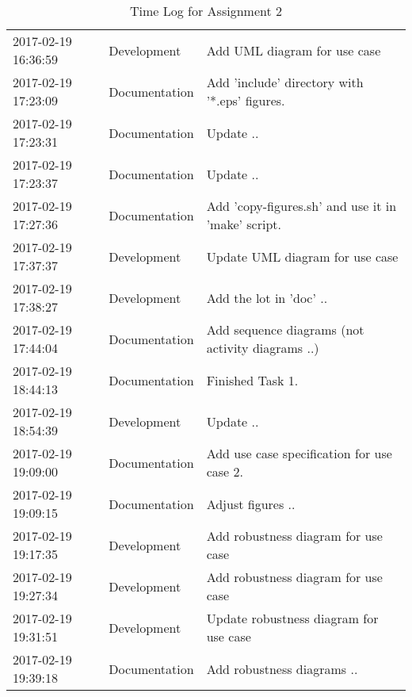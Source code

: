 \begin{table}[]
\begin{tabular}{@{}l|l|l}
    2017-02-19 16:36:59 & Development   & Add UML diagram for use case #2 ..                 \\
    2017-02-19 17:23:09 & Documentation & Add 'include' directory with '*.eps' figures.      \\
    2017-02-19 17:23:31 & Documentation & Update ..                                          \\
    2017-02-19 17:23:37 & Documentation & Update ..                                          \\
    2017-02-19 17:27:36 & Documentation & Add 'copy-figures.sh' and use it in 'make' script. \\
    2017-02-19 17:37:37 & Development   & Update UML diagram for use case #2.                \\
    2017-02-19 17:38:27 & Development   & Add the lot in 'doc' ..                            \\
    2017-02-19 17:44:04 & Documentation & Add sequence diagrams (not activity diagrams ..)   \\
    2017-02-19 18:44:13 & Documentation & Finished Task 1.                                   \\
    2017-02-19 18:54:39 & Development   & Update ..                                          \\
    2017-02-19 19:09:00 & Documentation & Add use case specification for use case 2.         \\
    2017-02-19 19:09:15 & Documentation & Adjust figures ..                                  \\
    2017-02-19 19:17:35 & Development   & Add robustness diagram for use case #1.            \\
    2017-02-19 19:27:34 & Development   & Add robustness diagram for use case #2.            \\
    2017-02-19 19:31:51 & Development   & Update robustness diagram for use case #1.         \\
    2017-02-19 19:39:18 & Documentation & Add robustness diagrams ..                         \\ \bottomrule
  \end{tabular}
  \caption{Time Log for Assignment 2}
  \label{table-timelog}
\end{table}

